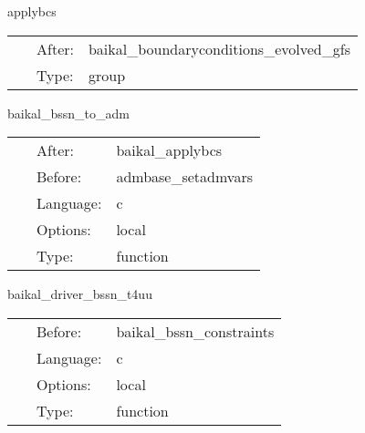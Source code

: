 \hspace{5mm} applybcs 

\hspace{5mm}{\it group for applying boundary conditions } 


\hspace{5mm}

 \begin{tabular*}{160mm}{cll} 
~ & After:  & baikal\_boundaryconditions\_evolved\_gfs \\ 
~ & Type:  & group \\ 
\end{tabular*} 


\vspace{5mm}


\hspace{5mm} baikal\_bssn\_to\_adm 

\hspace{5mm}{\it perform bssn-to-adm conversion. useful for diagnostics. } 


\hspace{5mm}

 \begin{tabular*}{160mm}{cll} 
~ & After:  & baikal\_applybcs \\ 
~ & Before:  & admbase\_setadmvars \\ 
~ & Language:  & c \\ 
~ & Options:  & local \\ 
~ & Type:  & function \\ 
\end{tabular*} 


\vspace{5mm}


\hspace{5mm} baikal\_driver\_bssn\_t4uu 

\hspace{5mm}{\it mol\_pseudoevolution: compute t4uu, needed for bssn constraints } 


\hspace{5mm}

 \begin{tabular*}{160mm}{cll} 
~ & Before:  & baikal\_bssn\_constraints \\ 
~ & Language:  & c \\ 
~ & Options:  & local \\ 
~ & Type:  & function \\ 
\end{tabular*} 


